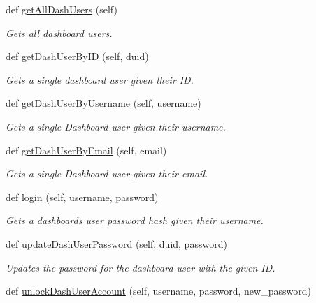 \begin{DoxyCompactItemize}
def \hyperlink{classhandler_1_1user_1_1_user_handler_a7fcf1c2f61bb89c83536a0066d089de1}{get\+All\+Dash\+Users} (self)
\begin{DoxyCompactList}\small\item\em Gets all dashboard users. \end{DoxyCompactList}\item 
def \hyperlink{classhandler_1_1user_1_1_user_handler_a8496fb014da7425079e6a2c02a5b6af6}{get\+Dash\+User\+By\+ID} (self, duid)
\begin{DoxyCompactList}\small\item\em Gets a single dashboard user given their ID. \end{DoxyCompactList}\item 
def \hyperlink{classhandler_1_1user_1_1_user_handler_a70ef6b477b3320b72ffdd736df0f0f96}{get\+Dash\+User\+By\+Username} (self, username)
\begin{DoxyCompactList}\small\item\em Gets a single Dashboard user given their username. \end{DoxyCompactList}\item 
def \hyperlink{classhandler_1_1user_1_1_user_handler_ae8de510893a8c86cc173b55739143368}{get\+Dash\+User\+By\+Email} (self, email)
\begin{DoxyCompactList}\small\item\em Gets a single Dashboard user given their email. \end{DoxyCompactList}\item 
def \hyperlink{classhandler_1_1user_1_1_user_handler_a83f742752a1b3d3bbf68c3cabc877f3c}{login} (self, username, password)
\begin{DoxyCompactList}\small\item\em Gets a dashboard\textquotesingle{}s user password hash given their username. \end{DoxyCompactList}\item 
def \hyperlink{classhandler_1_1user_1_1_user_handler_a56eaeae0434a67f7d99f4d7c670afdc9}{update\+Dash\+User\+Password} (self, duid, password)
\begin{DoxyCompactList}\small\item\em Updates the password for the dashboard user with the given ID. \end{DoxyCompactList}\item 
def \hyperlink{classhandler_1_1user_1_1_user_handler_aa2de9a5da6421296215e75fafeb9b9d4}{unlock\+Dash\+User\+Account} (self, username, password, new\+\_\+password)

\end{DoxyCompactItemize}
